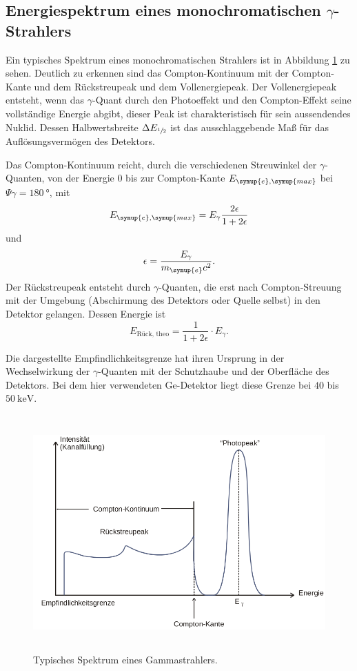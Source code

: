 \subsection{Energiespektrum eines monochromatischen \texorpdfstring{$\gamma$}{gamma}-Strahlers}
Ein typisches Spektrum eines monochromatischen Strahlers ist in Abbildung \ref{fig:Spektrum} zu sehen.
Deutlich zu erkennen sind das Compton-Kontinuum mit der Compton-Kante und dem Rückstreupeak und dem Vollenergiepeak.
Der Vollenergiepeak entsteht, wenn das $\gamma$-Quant durch den Photoeffekt und den Compton-Effekt seine vollständige Energie abgibt, dieser Peak ist charakteristisch für sein aussendendes Nuklid.
Dessen Halbwertsbreite $\Delta E_{\sfrac{1}{2}}$ ist das ausschlaggebende Maß für das Auflösungsvermögen des Detektors.

Das Compton-Kontinuum reicht, durch die verschiedenen Streuwinkel der $\gamma$-Quanten, von der Energie \num{0} bis zur Compton-Kante $E_{\symup{e},\symup{max}}$ bei $\Psi{\gamma}=\SI{180}{\degree}$, mit
\begin{equation}
\label{eqn:Com_Kante}
E_{\symup{e},\symup{max}}=E_{\gamma}\frac{2\epsilon}{1+2\epsilon}
\end{equation}
und
\begin{equation*}
\epsilon = \frac{E_{\gamma}}{m_{\symup{e}} c^2}.
\end{equation*}
Der Rückstreupeak entsteht durch $\gamma$-Quanten, die erst nach Compton-Streuung mit der Umgebung (Abschirmung des Detektors oder Quelle selbst) in den Detektor gelangen.
Dessen Energie ist
\begin{equation}
  \label{eqn:rueck}
  E_\text{Rück, theo} = \frac{1}{1+2\epsilon} \cdot E_{\gamma}.
\end{equation}

Die dargestellte Empfindlichkeitsgrenze hat ihren Ursprung in der Wechselwirkung der $\gamma$-Quanten mit der Schutzhaube und der Oberfläche des Detektors.
Bei dem hier verwendeten Ge-Detektor liegt diese Grenze bei $40$ bis $\SI{50}{\kilo\electronvolt}$.
 \begin{figure}
   \centering
   \includegraphics[height=9cm]{content/Spektrum.png}
   \caption{Typisches Spektrum eines Gammastrahlers.\cite{V18}}
   \label{fig:Spektrum}
 \end{figure}